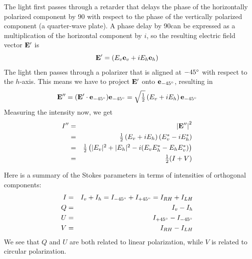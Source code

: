 The light first passes through a retarder that delays the phase of
the horizontally polarized component by 90\degree{} with respect to
the phase of the vertically polarized component (a quarter-wave
plate).
A phase delay by 90\degree can be expressed as a multiplication of the
horizontal component by $i$, so the resulting
electric field vector $\mathbf{E}^\prime$ is
\begin{equation}
  \label{eq:polarization:E_retarded}
  \mathbf{E}^\prime = \left(E_v \mathbf{e}_v +   i E_h \mathbf{e}_h \right) 
\end{equation}
The light then passes through a polarizer that is  aligned at
$-45^\circ$ with respect to the $h$-axis. This means we have to
project $\mathbf{E}^\prime$ onto $\mathbf{e}_{-45^\circ}$, resulting in
\begin{equation}
  \label{eq:polarization:E_retarded_polarized}
  \mathbf{E}^{\prime\prime} 
   = (\mathbf{E}^\prime \cdot \mathbf{e}_{-45^\circ})\mathbf{e}_{-45^\circ} 
   = \sqrt{\textstyle\frac{1}{2}}\left(E_v  +  i E_h  \right) \mathbf{e}_{-45^\circ} 
\end{equation}
Measuring the intensity now, we get
\begin{eqnarray}
  I^{\prime\prime} 
   &=&  \left| \mathbf{E}^{\prime\prime} \right| ^2 \\ \nonumber
   &=& \textstyle\frac{1}{2}\left(E_v +  i E_h  \right)  
     \left(E_v^\ast -  i E_h^\ast  \right)\\ \nonumber
   &=& \textstyle\frac{1}{2} \left( |E_v|^2 + |E_h|^2 - 
        i (E_v E_h^\ast -  E_h E_v^\ast )\right) \\ \nonumber
   &=& \textstyle\frac{1}{2} ( I + V )
  \label{eq:polarization:I_retarded_polarized}
\end{eqnarray}


Here is a summary of the Stokes parameters in terms of intensities of
orthogonal components:
\begin{eqnarray}
  \label{eq:polarization:stokesparam_Idiff_I}
  I &=& I_v + I_h = I_{-45^\circ} + I_{+45^\circ} = I_{RH} + I_{LH}\\
  \label{eq:polarization:stokesparam_Idiff_Q}
  Q &=&   I_v - I_h \\
  \label{eq:polarization:stokesparam_Idiff_U}
  U &=&  I_{+45^\circ} - I_{-45^\circ} \\
  \label{eq:polarization:stokesparam_Idiff_V}
  V &=&  I_{RH} - I_{LH}
\end{eqnarray}
We see that $Q$ and $U$ are both related to linear polarization, while
$V$ is related to circular polarization.

